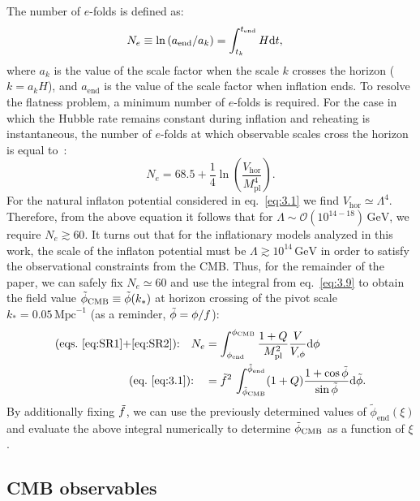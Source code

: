 \documentclass[a4paper,11pt]{article}
\begin{document}
The number of $e$-folds is defined as:
\begin{align}
    \label{eq:3.9}
    N_{e} \equiv \ln \left(a_{\mathrm{end}} / a_{k}\right)&=\int^{t_{\mathrm{end}}}_{t_{k}} H {\rm d} t,
\end{align}
where $a_k$ is the value of the scale factor when the scale $k$ crosses the horizon ($k=a_k H$), and $a_\mathrm{end}$ is the value of the scale factor when inflation ends. To resolve the flatness problem, a minimum number of $e$-folds is required. For the case in which the Hubble rate remains constant during inflation and reheating is instantaneous, the number of $e$-folds at which observable scales cross the horizon is equal to~\cite{Liddle:2003as}:
\begin{equation}
    N_{e}=68.5 +\frac{1}{4}\ln\left(\frac{V_{\mathrm{hor}}}{M_{\mathrm{pl}}^4}\right) . 
\end{equation}
For the natural inflaton potential considered in eq.~\eqref{eq:3.1} we find $V_{\mathrm{hor}}\simeq \Lambda^4$. Therefore, from the above equation it follows that for $\Lambda\sim\mathcal{O}(10^{14-18})\,\mathrm{GeV}$, we require $N_e\gtrsim 60$. It turns out that for the inflationary models analyzed in this work, the scale of the inflaton potential must be $\Lambda \gtrsim 10^{14}\,\mathrm{GeV}$ in order to satisfy the observational constraints from the CMB. Thus, for the remainder of the paper, we can safely fix $N_e\simeq 60$ and use the integral from eq.~\eqref{eq:3.9} to obtain the field value $\Tilde{\phi}_{\mathrm{CMB}}\equiv \Tilde{\phi}(k_*) $ at horizon
crossing of the pivot scale $k_* = 0.05\,\mathrm{Mpc}^{-1}$ (as a reminder, $\Tilde{\phi} = \phi/f$):
\begin{align}
\text{(eqs.~\eqref{eq:SR1}+\eqref{eq:SR2}):} \quad N_e &=\int_{\phi_{\mathrm{end }}}^{\phi_{\mathrm{CMB}}} \frac{1+Q}{M_{\mathrm{pl}}^{2}} \frac{V}{V_{, \phi}} {\rm d} \phi \\
\text{(eq.~\eqref{eq:3.1}):} \quad &=\Tilde{f}^2\,\int_{\Tilde{\phi}_{\mathrm{CMB}}}^{\Tilde{\phi}_{\mathrm{end}}} (1+Q) \frac{1+\cos \Tilde{\phi}}{\sin \Tilde{\phi}} {\rm d} \Tilde{\phi}.
\end{align}
By additionally fixing $\Tilde{f}$, we can use the previously determined values of $\tilde{\phi}_{\mathrm{end}}(\xi)$ and evaluate the above integral numerically to determine $\Tilde{\phi}_{\mathrm{CMB}}$ as a function of $\xi$.

\subsection{CMB observables}
\label{sec:3.3}
\end{document}
